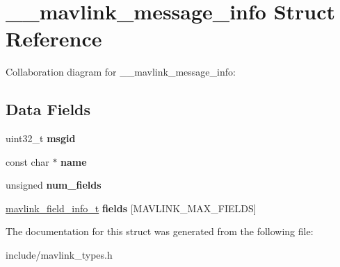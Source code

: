 \hypertarget{struct____mavlink__message__info}{}\section{\+\_\+\+\_\+mavlink\+\_\+message\+\_\+info Struct Reference}
\label{struct____mavlink__message__info}


Collaboration diagram for \+\_\+\+\_\+mavlink\+\_\+message\+\_\+info\+:
\subsection*{Data Fields}
\begin{DoxyCompactItemize}
\item 
uint32\+\_\+t {\bfseries msgid}\hypertarget{struct____mavlink__message__info_af49c77968d6fb92b3408dd1b70763ba7}{}\label{struct____mavlink__message__info_af49c77968d6fb92b3408dd1b70763ba7}

\item 
const char $\ast$ {\bfseries name}\hypertarget{struct____mavlink__message__info_a8f8f80d37794cde9472343e4487ba3eb}{}\label{struct____mavlink__message__info_a8f8f80d37794cde9472343e4487ba3eb}

\item 
unsigned {\bfseries num\+\_\+fields}\hypertarget{struct____mavlink__message__info_a4c772f3cf58e986ee1450ef3e73e56f2}{}\label{struct____mavlink__message__info_a4c772f3cf58e986ee1450ef3e73e56f2}

\item 
\hyperlink{struct____mavlink__field__info}{mavlink\+\_\+field\+\_\+info\+\_\+t} {\bfseries fields} \mbox{[}M\+A\+V\+L\+I\+N\+K\+\_\+\+M\+A\+X\+\_\+\+F\+I\+E\+L\+DS\mbox{]}\hypertarget{struct____mavlink__message__info_abee426c88ab46470e12d1c946a1d2fe0}{}\label{struct____mavlink__message__info_abee426c88ab46470e12d1c946a1d2fe0}

\end{DoxyCompactItemize}


The documentation for this struct was generated from the following file\+:\begin{DoxyCompactItemize}
\item 
include/mavlink\+\_\+types.\+h\end{DoxyCompactItemize}
